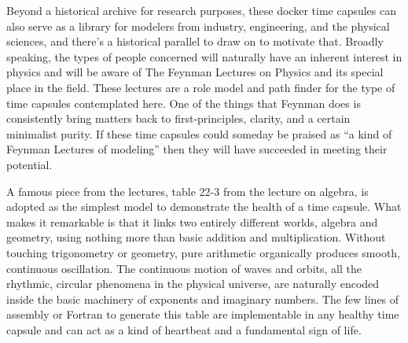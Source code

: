 Beyond a historical archive for research purposes, these docker time capsules can also serve as a library for modelers from industry, engineering, and the physical sciences, and there’s a historical parallel to draw on to motivate that. Broadly speaking, the types of people concerned will naturally have an inherent interest in physics and will be aware of The Feynman Lectures on Physics and its special place in the field. These lectures are a role model and path finder for the type of time capsules contemplated here. One of the things that Feynman does is consistently bring matters back to first-principles, clarity, and a certain minimalist purity. If these time capsules could someday be praised as “a kind of Feynman Lectures of modeling” then they will have succeeded in meeting their potential. 

A famous piece from the lectures, table 22-3 from the lecture on algebra, is adopted as the simplest model to demonstrate the health of a time capsule. What makes it remarkable is that it links two entirely different worlds, algebra and geometry, using nothing more than basic addition and multiplication. Without touching trigonometry or geometry, pure arithmetic organically produces smooth, continuous oscillation. The continuous motion of waves and orbits, all the rhythmic, circular phenomena in the physical universe, are naturally encoded inside the basic machinery of exponents and imaginary numbers. The few lines of assembly or Fortran to generate this table are implementable in any healthy time capsule and can act as a kind of heartbeat and a fundamental sign of life.
